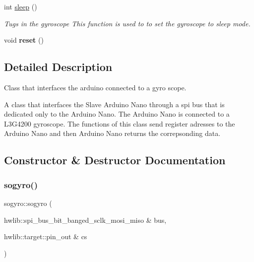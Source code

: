 \begin{DoxyCompactItemize}
\mbox{\label{classsogyro_a8f4d69c173d5552e22ce9e79bca19d3f}} 
int \hyperlink{classsogyro_a8f4d69c173d5552e22ce9e79bca19d3f}{sleep} ()
\begin{DoxyCompactList}\small\item\em Tugs in the gyroscope  This function is used to to set the gyroscope to sleep mode. \end{DoxyCompactList}\item 
\mbox{\label{classsogyro_a8c5d413a3026f0a80fb7929617349686}} 
void {\bfseries reset} ()
\end{DoxyCompactItemize}


\subsection{Detailed Description}
Class that interfaces the arduino connected to a gyro scope. 

A class that interfaces the Slave Arduino Nano through a spi bus that is dedicated only to the Arduino Nano. The Arduino Nano is connected to a L3\+G4200 gyroscope. The functions of this class send register adresses to the Arduino Nano and then Arduino Nano returns the correpsonding data. 

\subsection{Constructor \& Destructor Documentation}
\mbox{\label{classsogyro_ac7d4d6dd2fb21e10e9ad95262520635b}} 
\subsubsection{\texorpdfstring{sogyro()}{sogyro()}\hspace{0.1cm}{\footnotesize\ttfamily [1/2]}}
{\footnotesize\ttfamily sogyro\+::sogyro (\begin{DoxyParamCaption}\item[{hwlib\+::spi\+\_\+bus\+\_\+bit\+\_\+banged\+\_\+sclk\+\_\+mosi\+\_\+miso \&}]{bus,  }\item[{hwlib\+::target\+::pin\+\_\+out \&}]{cs }\end{DoxyParamCaption})\hspace{0.3cm}{\ttfamily [inline]}}



